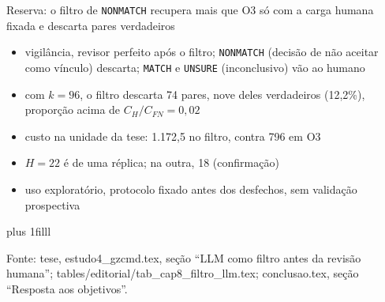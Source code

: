 \documentclass[aspectratio=169,11pt]{beamer}
\let\ressalvatexto\relax
\newcommand{\fontealign}{\raggedright}
\newcommand{\fonte}[2][tese, ]{\par\vskip 0pt plus 1filll
  \ifx\ressalvatexto\relax\else{\raggedright\footnotesize\color{black!70}\textit{Ressalva:} \ressalvatexto\par}\vskip 3pt\fi
  {\fontealign\tiny\color{black!65}Fonte: #1#2.\par}\vskip 3pt\global\let\ressalvatexto\relax}
\newcommand{\itens}[1]{\begin{itemize}#1\end{itemize}}
\begin{document}
\begin{frame}[label=R11]{Reserva: o filtro de \texttt{NONMATCH} recupera mais que O3 só com a carga humana fixada e descarta pares verdadeiros}
\footnotesize
\begin{center}
\end{center}
\itens{\item vigilância, revisor perfeito após o filtro; \texttt{NONMATCH} (decisão de não aceitar como vínculo) descarta; \texttt{MATCH} e \texttt{UNSURE} (inconclusivo) vão ao humano
\item com $k=96$, o filtro descarta 74 pares, nove deles verdadeiros (12,2\%), proporção acima de $C_H/C_{FN}=0{,}02$
\item custo na unidade da tese: 1.172,5 no filtro, contra 796 em O3
\item $H=22$ é de uma réplica; na outra, 18 (confirmação)
\item uso exploratório, protocolo fixado antes dos desfechos, sem validação prospectiva}
\fonte{estudo4\_gzcmd.tex, seção ``LLM como filtro antes da revisão humana''; tables/editorial/tab\_cap8\_filtro\_llm.tex; conclusao.tex, seção ``Resposta aos objetivos''}
\end{frame}
\end{document}
